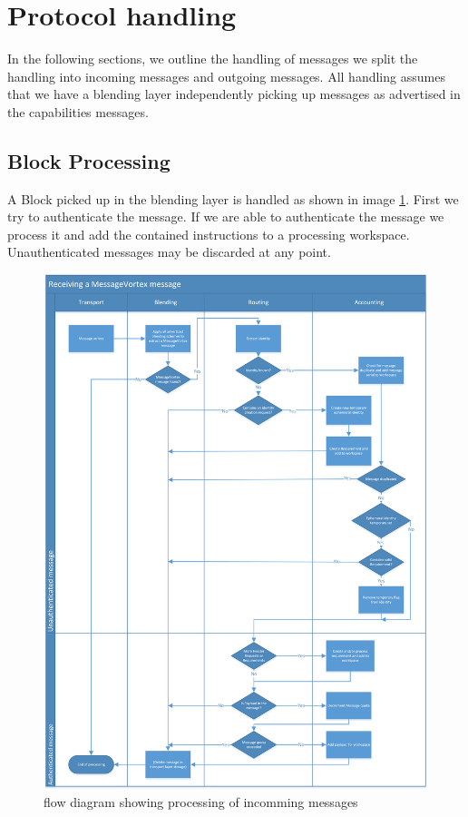 \section{Protocol handling}
In the following sections, we outline the handling of messages we split the handling into incoming messages and outgoing messages. All handling assumes that we have a blending layer independently picking up messages as advertised in the capabilities messages.

\subsection{Block Processing}
A Block picked up in the blending layer is handled as shown in image \ref{fig:msgRecvProcessing}. First we try to authenticate the message. If we are able to authenticate the message we process it and add the contained instructions to a processing workspace. Unauthenticated messages may be discarded at any point.

\begin{figure}[hbt]
	\includegraphics[width=\textwidth]{inc/flowchart_message_receiving}
	\caption{flow diagram showing processing of incomming messages}
	\label{fig:msgRecvProcessing}
\end{figure}

